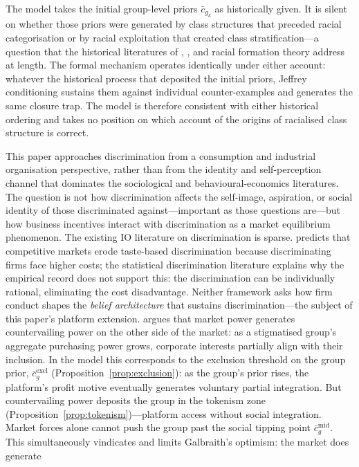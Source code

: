\documentclass[12pt,a4paper]{article}
\theoremstyle{definition}
\numberwithin{proposition}{subsection}
\begin{document}
The model takes the initial group-level priors $\bar{c}_{g_k}$
as historically given. It is silent on whether those priors were
generated by class structures that preceded racial categorisation or
by racial exploitation that created class stratification---a question
that the historical literatures of \citet{DuBois1935},
\citet{BonillaSilva1997}, and racial formation theory address at
length. The formal mechanism operates identically under either
account: whatever the historical process that deposited the initial
priors, Jeffrey conditioning sustains them against individual
counter-examples and generates the same closure trap. The model is
therefore consistent with either historical ordering and takes no
position on which account of the origins of racialised class
structure is correct.

This paper approaches discrimination from a consumption and
industrial organisation perspective, rather than from the identity
and self-perception channel that dominates the sociological and
behavioural-economics literatures. The question is not how
discrimination affects the self-image, aspiration, or social identity
of those discriminated against---important as those questions are---but
how business incentives interact with discrimination as a market
equilibrium phenomenon. The existing IO literature on discrimination
is sparse. \citet{Becker1957} predicts that competitive markets erode
taste-based discrimination because discriminating firms face higher
costs; the statistical discrimination literature explains why the
empirical record does not support this: the discrimination can be
individually rational, eliminating the cost disadvantage. Neither
framework asks how firm conduct shapes the \emph{belief architecture}
that sustains discrimination---the subject of this paper's platform
extension. \citet{Galbraith1952} argues that market power generates
countervailing power on the other side of the market: as a
stigmatised group's aggregate purchasing power grows, corporate
interests partially align with their inclusion. In the model this
corresponds to the exclusion threshold on the group prior,
$\bar{c}_g^{\text{excl}}$ (Proposition~\ref{prop:exclusion}): as the
group's prior rises, the platform's profit motive eventually
generates voluntary partial integration. But countervailing power
deposits the group in the tokenism zone
(Proposition~\ref{prop:tokenism})---platform access without social
integration. Market forces alone cannot push the group past the
social tipping point $\bar{c}_g^{\text{mid}}$. This simultaneously
vindicates and limits Galbraith's optimism: the market does generate
\end{document}
